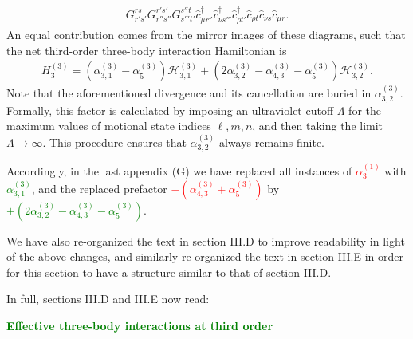 \documentclass[preprint,showkeys,nofootinbib]{revtex4-1}
\newcommand{\p}[1]{\left(#1\right)} %
\renewcommand{\c}{\hat{c}}
\renewcommand{\H}{\mathcal{H}}
\newcommand{\1}{\mathds{1}}
\newcommand{\red}[1]{\textcolor{red}{#1}}
\newcommand{\green}[1]{\textcolor{green}{#1}}
\begin{document}
\begin{enumerate}
{\begin{align}
      G^{rs}_{r's'} G^{r's'}_{r''s''} G^{s''t}_{s'''t'}
      \c_{\mu r''}^\dag \c_{\nu s'''}^\dag \c_{\rho t'}^\dag
      \c_{\rho t} \c_{\nu s} \c_{\mu r}.
      \tag{35}
    \end{align}
    An equal contribution comes from the mirror images of these
    diagrams, such that the net third-order three-body interaction
    Hamiltonian is
    \begin{align}
      H_3^{(3)} = \p{\alpha_{3,1}^{(3)} - \alpha_5^{(3)}} \H_{3,1}^{(3)}
      + \p{2\alpha_{3,2}^{(3)} - \alpha_{4,3}^{(3)} - \alpha_5^{(3)}}
      \H_{3,2}^{(3)}.
      \tag{36}
    \end{align}
    Note that the aforementioned divergence and its cancellation are
    buried in $\alpha_{3,2}^{(3)}$.  Formally, this factor is
    calculated by imposing an ultraviolet cutoff $\Lambda$ for the
    maximum values of motional state indices $\ell,m,n$, and then
    taking the limit $\Lambda\to\infty$.  This procedure ensures that
    $\alpha_{3,2}^{(3)}$ always remains finite.}

  Accordingly, in the last appendix (G) we have replaced all instances
  of \red{$\alpha_3^{(1)}$} with \green{$\alpha_{3,1}^{(3)}$}, and the
  replaced prefactor \red{$-\p{\alpha_{4,3}^{(3)}+\alpha_5^{(3)}}$} by
  \green{$+ \p{2\alpha_{3,2}^{(3)} - \alpha_{4,3}^{(3)} -
      \alpha_5^{(3)}}$}.

  We have also re-organized the text in section III.D to improve
  readability in light of the above changes, and similarly
  re-organized the text in section III.E in order for this section to
  have a structure similar to that of section III.D.

  In full, sections III.D and III.E now read:

  \green{{\bf Effective three-body interactions at third order}}


\end{enumerate}
\end{document}
